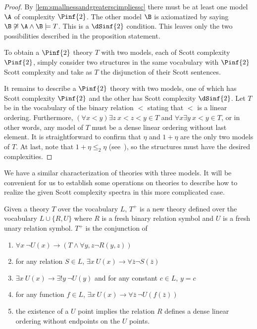 \documentclass{amsart}
\renewcommand{\-}{\text{-}}
\begin{document}
\begin{proof}
By \cref{lem:smallnessandgreaterscimpliessc} there must be at least one model $\A$ of complexity $\Pinf{2}$.
The other model $\B$ is axiomatized by saying $\B\not\cong\A\land\B\models T$.
This is a $\dSinf{2}$ condition.
This leaves only the two possibilities described in the proposition statement.

To obtain a $\Pinf{2}$ theory $T$ with two models, each of Scott complexity $\Pinf{2}$, simply consider two structures in the same vocabulary with $\Pinf{2}$ Scott complexity and take as $T$ the disjunction of their Scott sentences.

It remains to describe a $\Pinf{2}$ theory with two models, one of which has Scott complexity $\Pinf{2}$ and the other has Scott complexity $\dSinf{2}$.
Let $T$ be in the vocabulary of the binary relation $<$ stating that $<$ is a linear ordering.
Furthermore, $(\forall x<y) \exists z\ x<z<y\in T$ and $\forall x\exists y \ x<y\in T$, or in other words, any model of $T$ must be a dense linear ordering without last element.
It is straightforward to confirm that $\eta$ and $1+\eta$ are the only two models of $T$. %
At last, note that $1+\eta\leq_2 \eta$ (see~\cite[Lemma 2.4]{GR24}), so the structures must have the desired complexities.
\end{proof}

We have a similar characterization of theories with three models.
It will be convenient for us to establish some operations on theories to describe how to realize the given Scott complexity spectra in this more complicated case.

\begin{definition}
Given a theory $T$ over the vocabulary $L$, $T^+$ is a new theory defined over the vocabulary $L\cup\{R,U\}$ where $R$ is a fresh binary relation symbol and $U$ is a fresh unary relation symbol.
$T^+$ is the conjunction of 
\begin{enumerate}
	\item $\forall x\ \lnot U(x)\to (T\land \forall y,z \lnot R(y,z))$
	\item for any relation $S\in L$, $\exists x\  U(x) \to \forall \bar{z} \lnot S(\bar{z})$
	\item $\exists x\ U(x) \to \exists! y\ \lnot U(y)$ and for any constant $c\in L$, $y=c$
	\item for any function $f\in L$, $\exists x\  U(x) \to \forall \bar{z}\  \lnot U(f(\bar{z}))$
	\item the existence of a $U$ point implies the relation $R$ defines a dense linear ordering without endpoints on the $U$ points.
\end{enumerate}
\end{definition}
\end{document}
